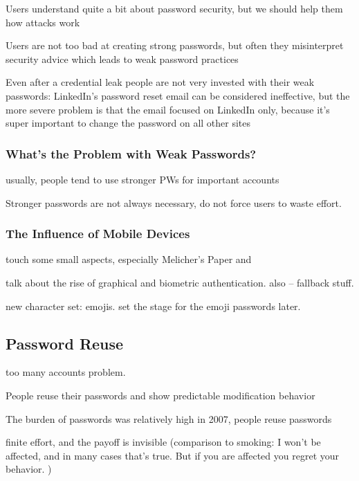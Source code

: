 	Users understand quite a bit about password security, but we should help them how attacks work \cite{Ur2016PerceptionsPassword}
	
	
	Users are not too bad at creating strong passwords, but often they misinterpret security advice which leads to weak password practices \cite{Ur2015PWCreationLab}
	
	Even after a credential leak people are not very invested with their weak passwords: LinkedIn's password reset email can be considered ineffective, but the more severe problem is that the email focused on LinkedIn only, because it's super important to change the password on all other sites \cite{Huh2017TooBusy}
	
	\subsubsection{What's the Problem with Weak Passwords?}
	usually, people tend to use stronger PWs for important accounts
	
	Stronger passwords are not always necessary, do not force users to waste effort. \cite{Florencio2007DoStrongWebPasswords}	
	
	\cite{Shay2014ReligiousAunt}
	
	\subsubsection{The Influence of Mobile Devices}
	touch some small aspects, especially Melicher's Paper \cite{Melicher2016UsabilityMobileTextPasswords} and \cite{VonZezschwitz2014HoneyIShrunkTheKeys}
	\cite{Haque2014PsychometricsStrongPassword} 
	
	talk about the rise of graphical and biometric authentication. 
	also \cite{Cherapau2015ImpactOfTouchID} -- fallback stuff.
	
	new character set: emojis.
	set the stage for the emoji passwords later. 

	\subsection{Password Reuse}
	too many accounts problem.
	
	People reuse their passwords and show predictable modification behavior \cite{Gaw2005ReuseRecycle}
	
	The burden of passwords was relatively high in 2007, people reuse passwords \cite{Florencio2007LargeScaleStudyPasswordHabits}
	
	finite effort, and the payoff is invisible (comparison to smoking: I won't be affected, and in many cases that's true. But if you are affected you regret your behavior. )
	
